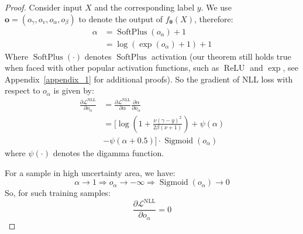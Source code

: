 \begin{proof}
Consider input $X$ and the corresponding label $y$. We use $\boldsymbol{o}=(o_{\gamma}, o_{v}, o_{\alpha}, o_{\beta})$ to denote the output of $f_{\boldsymbol{\theta}}(X)$, therefore:
\begin{equation}
\begin{aligned}
\alpha&=\operatorname{SoftPlus}(o_{\alpha}) + 1  \\
      &= \log(\exp(o_{\alpha})+1)+1 
\end{aligned}
\end{equation}
Where $\operatorname{SoftPlus}(\cdot)$ denotes $\operatorname{SoftPlus}$ activation (our theorem still holds true when faced with other popular activation functions, such as $\operatorname{ReLU}$ and $\operatorname{exp}$, see Appendix~\ref{appendix_1} for additional proofs). 
So the gradient of NLL loss with respect to $o_{\alpha}$ is given by:
\begin{equation}
\begin{aligned}
\frac{\partial \mathcal{L}^{\mathrm{NLL}}}{\partial o_\alpha} &= \frac{\partial \mathcal{L}^{\mathrm{NLL}}}{\partial \alpha} \frac{\partial \alpha}{\partial o_{\alpha}}     \\
&=[\log(1+\frac{\nu(\gamma-y)^2}{2\beta(\nu+1)}) +\psi(\alpha) \\
&- \psi(\alpha+0.5)] \cdot \operatorname{Sigmoid}\left(o_\alpha\right)
\end{aligned}
\end{equation}
where $\psi(\cdot)$ denotes the digamma function.

For a sample in high uncertainty area, we have:
\begin{equation}
    \alpha \rightarrow 1 \Rightarrow o_\alpha \rightarrow-\infty \Rightarrow \operatorname{Sigmoid}\left(o_\alpha\right) \rightarrow 0
\end{equation}
So, for such training samples:
\begin{equation}
    \frac{\partial \mathcal{L}^{\mathrm{NLL}}}{\partial o_\alpha} = 0
\end{equation}


\end{proof}
